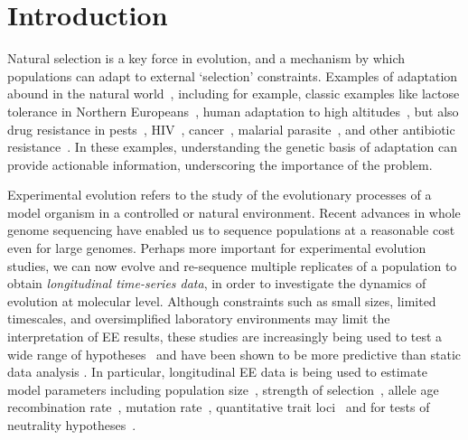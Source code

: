 \section{Introduction}
Natural selection is a key force in evolution, and a mechanism by
which populations can adapt to external `selection'
constraints. Examples of adaptation abound in the natural 
world~\cite{going2016fan},
including for example, classic examples like lactose tolerance in
Northern Europeans~\cite{bersaglieri2004genetic}, human adaptation to
high altitudes~\cite{yi2010sequencing,simonson2010genetic}, but also
drug resistance in pests~\cite{daborn2001ddt},
HIV~\cite{Feder2016More},
cancer~\cite{gottesman2002mechanisms,zahreddine2013mechanisms},
malarial parasite~\cite{ariey2014molecular,nair2007recurrent}, and
other antibiotic resistance~\cite{spellberg2008epidemic}. In these
examples, understanding the genetic basis of adaptation can provide
actionable information, underscoring the importance of the problem.

Experimental evolution refers to the study of the evolutionary
processes of a model organism in a controlled
\cite{hegreness2006equivalence,lang2013pervasive,orozco2012adaptation,
  lang2011genetic,barrick2009genome,bollback2007clonal,oz2014strength}
or natural
\cite{maldarelli2013hiv,reid2011new,denef2012situ,winters2012development,
  daniels2013genetic,barrett2008natural,bergland2014genomic}
environment. Recent advances in whole genome sequencing have enabled
us to sequence populations at a reasonable cost even for large
genomes. Perhaps more important for experimental evolution studies, we
can now evolve and re-sequence multiple replicates of a population to
obtain \emph{longitudinal time-series data}, in order to investigate
the dynamics of evolution at molecular level.  Although constraints
such as small sizes, limited timescales, and oversimplified
laboratory environments may limit the interpretation of EE results,
these studies are increasingly being used to test a wide range of
hypotheses~\cite{kawecki2012experimental} and have been shown to be
more predictive than static data analysis
\cite{boyko2008assessing,desai2008polymorphism,sawyer1992population}.
In particular, longitudinal EE data is being used to estimate model
parameters including population
size~\cite{williamson1999using,wang2001pseudo,pollak1983new,waples1989generalized,
  Terhorst2015Multi, jonas2016estimating}, strength of
selection~\cite{mathieson2013estimating,illingworth2011distinguishing,Terhorst2015Multi,
  bollback2008estimation,illingworth2012quantifying,malaspinas2012estimating,
  steinrucken2014novel}, allele age~\cite{malaspinas2012estimating}
recombination rate~\cite{Terhorst2015Multi}, mutation
rate~\cite{Barrick2013Genome, Terhorst2015Multi}, quantitative trait
loci~\cite{baldwin2014power} and for tests of neutrality
hypotheses~\cite{feder2014Identifying,Terhorst2015Multi,burke2010genome,bergland2014genomic}.

